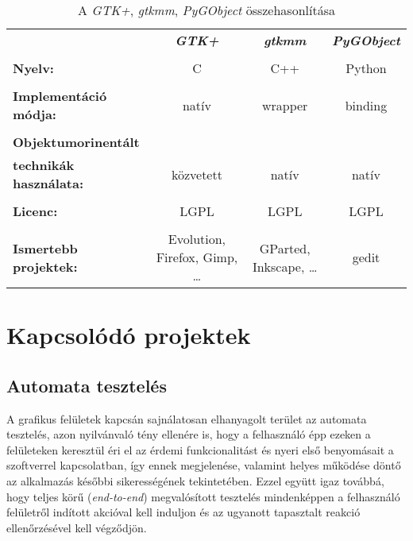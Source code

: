 \begin{table}
\begin{center}
\begin{tabular}[t]{l c c c}
                                & \textbf{\textit{GTK+}}          & \textbf{\textit{gtkmm}}  & \textbf{\textit{PyGObject}} \\\\
\textbf{Nyelv:}                 & C                               & C++                      & Python                      \\\\
\textbf{Implementáció módja:}   & natív                           & wrapper                  & binding                     \\\\
\textbf{Objektumorinentált}     &                                 &                          &                             \\
\textbf{technikák használata:}  & közvetett                       & natív                    & natív                       \\\\
\textbf{Licenc:}                & LGPL                            & LGPL                     & LGPL                        \\\\
\textbf{Ismertebb projektek:}   & Evolution, Firefox, Gimp, \dots & GParted, Inkscape, \dots & gedit                       \\

\end{tabular}
\caption{A \textit{GTK+}, \textit{gtkmm}, \textit{PyGObject} összehasonlítása}
\label{tab:comparselanguages}
\end{center}
\end{table}

\section{Kapcsolódó projektek}

\subsection{Automata tesztelés}

A grafikus felületek kapcsán sajnálatosan elhanyagolt terület az automata tesztelés, azon nyilvánvaló tény ellenére is, hogy a felhasználó épp ezeken a felületeken keresztül éri el az érdemi funkcionalitást és nyeri első benyomásait a szoftverrel kapcsolatban, így ennek megjelenése, valamint helyes működése döntő az alkalmazás későbbi sikerességének tekintetében. Ezzel együtt igaz továbbá, hogy teljes körű (\textit{end-to-end}) megvalósított tesztelés mindenképpen a felhasználó felületről indított akcióval kell induljon és az ugyanott tapasztalt reakció ellenőrzésével kell végződjön.


